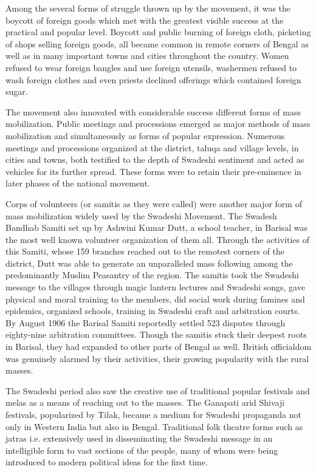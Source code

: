 Among the several forms of struggle thrown up by the movement, it was the boycott of foreign goods which met with the greatest visible success at the practical and popular level. Boycott and public burning of foreign cloth, picketing of shops selling foreign goods, all became common in remote corners of Bengal as well as in many important towns and cities throughout the country. Women refused to wear foreign bangles and use foreign utensils, washermen refused to wash foreign clothes and even priests declined offerings which contained foreign sugar.

The movement also innovated with considerable success different forms of mass mobilization. Public meetings and processions emerged as major methods of mass mobilization and simultaneously as forms of popular expression. Numerous meetings and processions organized at the district, taluqa and village levels, in cities and towns, both testified to the depth of Swadeshi sentiment and acted as vehicles for its further spread. These forms were to retain their pre-eminence in later phases of the national movement.

Corps of volunteers (or samitis as they were called) were another major form of mass mobilization widely used by the Swadeshi Movement. The Swadesh Bandhab Samiti set up by Ashwini Kumar Dutt, a school teacher, in Barisal was the most well known volunteer organization of them all. Through the activities of this Samiti, whose 159 branches reached out to the remotest corners of the district, Dutt was able to generate an unparalleled mass following among the predominantly Muslim Peasantry of the region. The samitis took the Swadeshi message to the villages through magic lantern lectures and Swadeshi songs, gave physical and moral training to the members, did social work during famines and epidemics, organized schools, training in Swadeshi craft and arbitration courts. By August 1906 the Barisal Samiti reportedly settled 523 disputes through eighty-nine arbitration committees. Though the samitis stuck their deepest roots in Barisal, they had expanded to other parts of Bengal as well. British officialdom was genuinely alarmed by their activities, their growing popularity with the rural masses.

The Swadeshi period also saw the creative use of traditional popular festivals and melas as a means of reaching out to the masses. The Ganapati arid Shivaji festivals, popularized by Tilak, became a medium for Swadeshi propaganda not only in Western India but also in Bengal. Traditional folk theatre forms such as jatras i.e. extensively used in disseminating the Swadeshi message in an intelligible form to vast sections of the people, many of whom were being introduced to modern political ideas for the first time.

